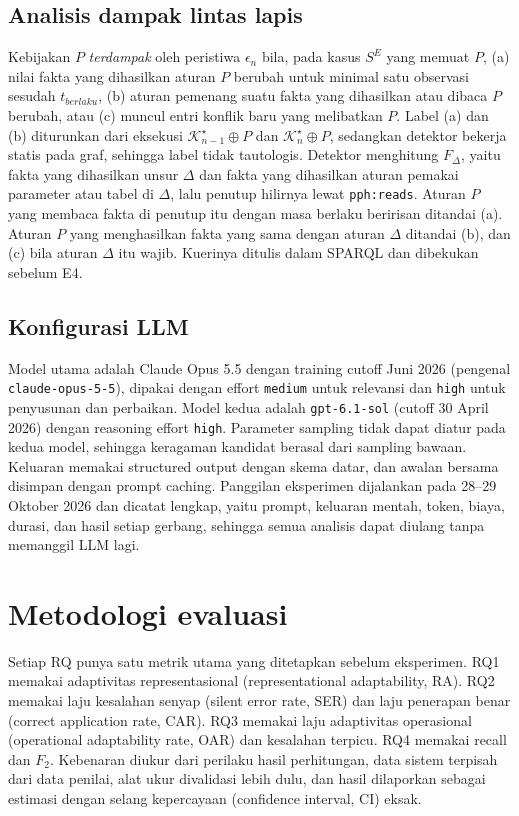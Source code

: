 \documentclass[conference]{IEEEtran}
\makeatletter
\DeclareRobustCommand{\en}[1]{{\usefont{\f@encoding}{\f@family}{\f@series}{it}#1\/}}
\newcommand{\K}{\mathcal{K}}
\newcommand{\emas}{\star}
\newcommand{\SE}{S^{E}}
\makeatother
\begin{document}
\subsection{Analisis dampak lintas lapis}
Kebijakan $P$ \emph{terdampak} oleh peristiwa $\epsilon_n$ bila, pada kasus $\SE$ yang memuat $P$, (a) nilai fakta yang dihasilkan aturan $P$ berubah untuk minimal satu observasi sesudah $t_{\mathit{berlaku}}$, (b) aturan pemenang suatu fakta yang dihasilkan atau dibaca $P$ berubah, atau (c) muncul entri konflik baru yang melibatkan $P$. Label (a) dan (b) diturunkan dari eksekusi $\K^{\emas}_{n-1} \oplus P$ dan $\K^{\emas}_n \oplus P$, sedangkan detektor bekerja statis pada graf, sehingga label tidak tautologis. Detektor menghitung $F_\Delta$, yaitu fakta yang dihasilkan unsur $\Delta$ dan fakta yang dihasilkan aturan pemakai parameter atau tabel di $\Delta$, lalu penutup hilirnya lewat \texttt{pph:reads}. Aturan $P$ yang membaca fakta di penutup itu dengan masa berlaku beririsan ditandai (a). Aturan $P$ yang menghasilkan fakta yang sama dengan aturan $\Delta$ ditandai (b), dan (c) bila aturan $\Delta$ itu wajib. Kuerinya ditulis dalam SPARQL dan dibekukan sebelum E4.

\subsection{Konfigurasi LLM}
\label{subsec:konfigurasi}
Model utama adalah Claude Opus 5.5 dengan \en{training cutoff} Juni 2026 (pengenal \texttt{claude-opus-5-5}), dipakai dengan \en{effort} \texttt{medium} untuk relevansi dan \texttt{high} untuk penyusunan dan perbaikan. Model kedua adalah \texttt{gpt-6.1-sol} (\en{cutoff} 30 April 2026) dengan \en{reasoning effort} \texttt{high}. Parameter \en{sampling} tidak dapat diatur pada kedua model, sehingga keragaman kandidat berasal dari \en{sampling} bawaan. Keluaran memakai \en{structured output} dengan skema datar, dan awalan bersama disimpan dengan \en{prompt caching}. Panggilan eksperimen dijalankan pada 28--29 Oktober 2026 dan dicatat lengkap, yaitu \en{prompt}, keluaran mentah, token, biaya, durasi, dan hasil setiap gerbang, sehingga semua analisis dapat diulang tanpa memanggil LLM lagi.

\section{Metodologi evaluasi}
\label{sec:evaluasi}
Setiap RQ punya satu metrik utama yang ditetapkan sebelum eksperimen. RQ1 memakai adaptivitas representasional (\en{representational adaptability}, RA). RQ2 memakai laju kesalahan senyap (\en{silent error rate}, SER) dan laju penerapan benar (\en{correct application rate}, CAR). RQ3 memakai laju adaptivitas operasional (\en{operational adaptability rate}, OAR) dan kesalahan terpicu. RQ4 memakai \en{recall} dan $F_2$. Kebenaran diukur dari perilaku hasil perhitungan, data sistem terpisah dari data penilai, alat ukur divalidasi lebih dulu, dan hasil dilaporkan sebagai estimasi dengan selang kepercayaan (\en{confidence interval}, CI) eksak.
\end{document}
